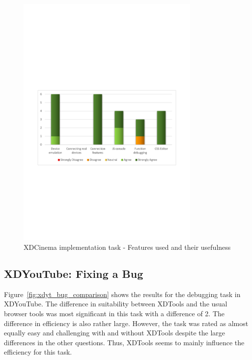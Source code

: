 \begin{figure}[H]
  \centering
    \includegraphics[width=0.8\textwidth]{images/charts/xdc_impl_features_used.pdf}
	\caption[xdc-impl: Features used]{XDCinema implementation task - Features used and their usefulness}
	\label{fig:xdc_impl_features_used}
\end{figure}

\subsection{XDYouTube: Fixing a Bug}

Figure~\ref{fig:xdyt_bug_comparison} shows the results for the debugging task in XDYouTube. The difference in suitability between XDTools and the usual browser tools was most significant in this task with a difference of 2. The difference in efficiency is also rather large. However, the task was rated as almost equally easy and challenging with and without XDTools despite the large differences in the other questions. Thus, XDTools seems to mainly influence the efficiency for this task. 

